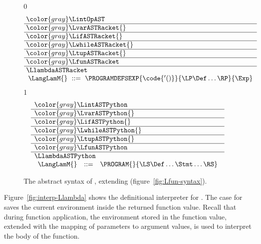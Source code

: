 \documentclass[7x10]{TimesAPriori_MIT}%
\newcommand{\gray}[1]{{\color{gray} #1}}
\def\racketEd{0}
\def\pythonEd{1}
\providecommand{\BookEdition}{1}
\let\edition\BookEdition
\newcommand{\pythonColor}[0]{}
\numberwithin{theorem}{chapter}
\numberwithin{definition}{chapter}
\numberwithin{equation}{chapter}
\begin{document}
\begin{figure}[tp]
\centering
\begin{tcolorbox}[colback=white]
    \small
{\if\edition\racketEd
\[\arraycolsep=3pt
\begin{array}{l}
  \gray{\LintOpAST} \\ \hline
  \gray{\LvarASTRacket{}} \\ \hline
  \gray{\LifASTRacket{}} \\ \hline
  \gray{\LwhileASTRacket{}} \\ \hline
  \gray{\LtupASTRacket{}} \\ \hline
  \gray{\LfunASTRacket} \\ \hline
  \LlambdaASTRacket \\
  \begin{array}{lcl}
  \LangLamM{} &::=& \PROGRAMDEFSEXP{\code{'()}}{\LP\Def\ldots\RP}{\Exp}
  \end{array}
\end{array}
\]
\fi}
{\if\edition\pythonEd\pythonColor
\[
\begin{array}{l}
  \gray{\LintASTPython} \\ \hline
  \gray{\LvarASTPython{}} \\ \hline
  \gray{\LifASTPython{}} \\ \hline
  \gray{\LwhileASTPython{}} \\ \hline
  \gray{\LtupASTPython{}} \\ \hline
  \gray{\LfunASTPython} \\ \hline
  \LlambdaASTPython \\
  \begin{array}{lcl}
  \LangLamM{} &::=& \PROGRAM{}{\LS \Def \ldots \Stmt \ldots \RS}
  \end{array}
\end{array}
\]
\fi}
\end{tcolorbox}

\caption{The abstract syntax of \LangLam{}, extending \LangFun{} (figure~\ref{fig:Lfun-syntax}).}
\label{fig:Llam-syntax}
\end{figure}

Figure~\ref{fig:interp-Llambda} shows the definitional
interpreter for \LangLam{}. The case for
 saves the current environment inside the returned
function value. Recall that during function application, the
environment stored in the function value, extended with the mapping of
parameters to argument values, is used to interpret the body of the
function.
\end{document}
